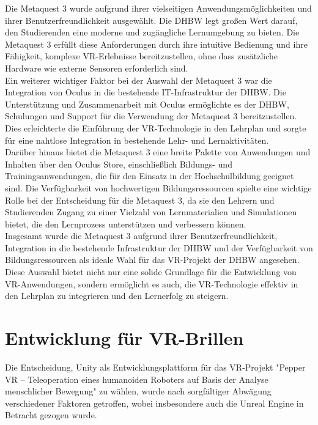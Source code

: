 \noindent
Die Metaquest 3 wurde aufgrund ihrer vielseitigen Anwendungsmöglichkeiten und ihrer Benutzerfreundlichkeit ausgewählt. Die DHBW legt großen Wert darauf, den Studierenden eine moderne und zugängliche Lernumgebung zu bieten. Die Metaquest 3 erfüllt diese Anforderungen durch ihre intuitive Bedienung und ihre Fähigkeit, komplexe VR-Erlebnisse bereitzustellen, ohne dass zusätzliche Hardware wie externe Sensoren erforderlich sind.
\\

\noindent
Ein weiterer wichtiger Faktor bei der Auswahl der Metaquest 3 war die Integration von Oculus in die bestehende IT-Infrastruktur der DHBW. Die Unterstützung und Zusammenarbeit mit Oculus ermöglichte es der DHBW, Schulungen und Support für die Verwendung der Metaquest 3 bereitzustellen. Dies erleichterte die Einführung der VR-Technologie in den Lehrplan und sorgte für eine nahtlose Integration in bestehende Lehr- und Lernaktivitäten.
\\

\noindent
Darüber hinaus bietet die Metaquest 3 eine breite Palette von Anwendungen und Inhalten über den Oculus Store, einschließlich Bildungs- und Trainingsanwendungen, die für den Einsatz in der Hochschulbildung geeignet sind. Die Verfügbarkeit von hochwertigen Bildungsressourcen spielte eine wichtige Rolle bei der Entscheidung für die Metaquest 3, da sie den Lehrern und Studierenden Zugang zu einer Vielzahl von Lernmaterialien und Simulationen bietet, die den Lernprozess unterstützen und verbessern können.
\\

\noindent
Insgesamt wurde die Metaquest 3 aufgrund ihrer Benutzerfreundlichkeit, Integration in die bestehende Infrastruktur der DHBW und der Verfügbarkeit von Bildungsressourcen als ideale Wahl für das VR-Projekt der DHBW angesehen. Diese Auswahl bietet nicht nur eine solide Grundlage für die Entwicklung von VR-Anwendungen, sondern ermöglicht es auch, die VR-Technologie effektiv in den Lehrplan zu integrieren und den Lernerfolg zu steigern.
\section{Entwicklung für VR-Brillen}
Die Entscheidung, Unity als Entwicklungsplattform für das VR-Projekt "Pepper VR – Teleoperation eines humanoiden Roboters auf Basis der Analyse menschlicher Bewegung" zu wählen, wurde nach sorgfältiger Abwägung verschiedener Faktoren getroffen, wobei insbesondere auch die Unreal Engine in Betracht gezogen wurde.

